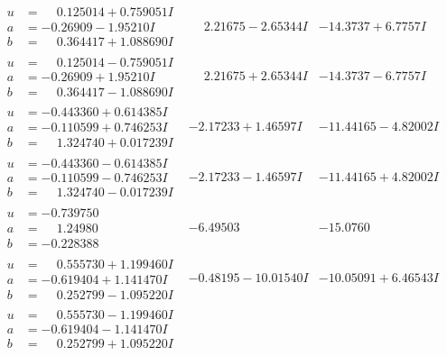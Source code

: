 \documentclass[1p]{elsarticle_modified}
\theoremstyle{definition}
\begin{document}
$$\begin{array}{c|c|c}
\begin{aligned}
u &= \phantom{-}0.125014 + 0.759051 I \\
a &= -0.26909 - 1.95210 I \\
b &= \phantom{-}0.364417 + 1.088690 I\end{aligned}
 & \phantom{-}2.21675 - 2.65344 I & -14.3737 + 6.7757 I \\ \hline\begin{aligned}
u &= \phantom{-}0.125014 - 0.759051 I \\
a &= -0.26909 + 1.95210 I \\
b &= \phantom{-}0.364417 - 1.088690 I\end{aligned}
 & \phantom{-}2.21675 + 2.65344 I & -14.3737 - 6.7757 I \\ \hline\begin{aligned}
u &= -0.443360 + 0.614385 I \\
a &= -0.110599 + 0.746253 I \\
b &= \phantom{-}1.324740 + 0.017239 I\end{aligned}
 & -2.17233 + 1.46597 I & -11.44165 - 4.82002 I \\ \hline\begin{aligned}
u &= -0.443360 - 0.614385 I \\
a &= -0.110599 - 0.746253 I \\
b &= \phantom{-}1.324740 - 0.017239 I\end{aligned}
 & -2.17233 - 1.46597 I & -11.44165 + 4.82002 I \\ \hline\begin{aligned}
u &= -0.739750\phantom{ +0.000000I} \\
a &= \phantom{-}1.24980\phantom{ +0.000000I} \\
b &= -0.228388\phantom{ +0.000000I}\end{aligned}
 & -6.49503\phantom{ +0.000000I} & -15.0760\phantom{ +0.000000I} \\ \hline\begin{aligned}
u &= \phantom{-}0.555730 + 1.199460 I \\
a &= -0.619404 + 1.141470 I \\
b &= \phantom{-}0.252799 - 1.095220 I\end{aligned}
 & -0.48195 - 10.01540 I & -10.05091 + 6.46543 I \\ \hline\begin{aligned}
u &= \phantom{-}0.555730 - 1.199460 I \\
a &= -0.619404 - 1.141470 I \\
b &= \phantom{-}0.252799 + 1.095220 I\end{aligned}

\end{array}$$
\end{document}
